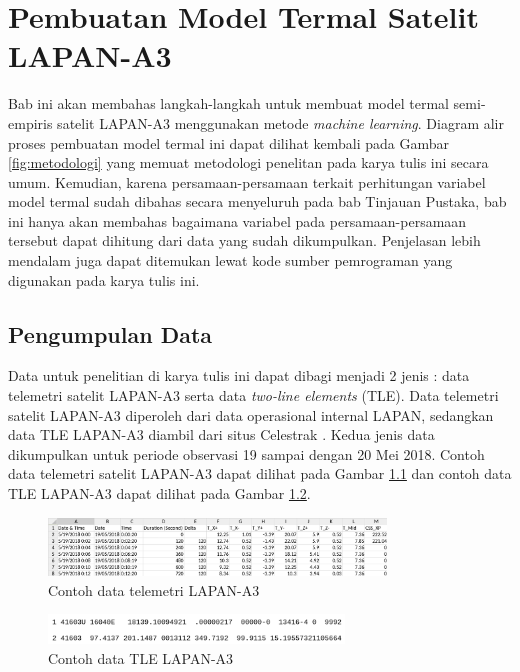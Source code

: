 \chapter{Pembuatan Model Termal Satelit LAPAN-A3}

Bab ini akan membahas langkah-langkah untuk membuat model termal semi-empiris
satelit LAPAN-A3 menggunakan metode \textit{machine learning}. Diagram alir
proses pembuatan model termal ini dapat dilihat kembali pada Gambar
\ref{fig:metodologi} yang memuat metodologi penelitan pada karya tulis ini
secara umum. Kemudian, karena persamaan-persamaan terkait perhitungan variabel
model termal sudah dibahas secara menyeluruh pada bab Tinjauan Pustaka, bab ini
hanya akan membahas bagaimana variabel pada persamaan-persamaan tersebut dapat
dihitung dari data yang sudah dikumpulkan. Penjelasan lebih mendalam juga dapat
ditemukan lewat kode sumber pemrograman yang digunakan pada karya tulis ini.

\section{Pengumpulan Data}

Data untuk penelitian di karya tulis ini dapat dibagi menjadi 2 jenis : data
telemetri satelit LAPAN-A3 serta data \textit{two-line elements} (TLE). Data
telemetri satelit LAPAN-A3 diperoleh dari data operasional internal LAPAN,
sedangkan data TLE LAPAN-A3 diambil dari situs Celestrak \cite{kelso}. Kedua
jenis data dikumpulkan untuk periode observasi 19 sampai dengan 20 Mei 2018.
Contoh data telemetri satelit LAPAN-A3 dapat dilihat pada Gambar
\ref{fig:telea3} dan contoh data TLE LAPAN-A3 dapat dilihat pada Gambar
\ref{fig:tlea3}.

\begin{figure}[H]
\setlength{}
\begin{center}
\includegraphics[width=0.8\textwidth]{fig/telea3.png}
\caption{Contoh data telemetri LAPAN-A3}
\label{fig:telea3}
\end{center}
\end{figure}

\begin{figure}[H]
\setlength{}
\begin{center}
\includegraphics[width=0.7\textwidth]{fig/tlea3.png}
\caption{Contoh data TLE LAPAN-A3}
\label{fig:tlea3}
\end{center}
\end{figure}

